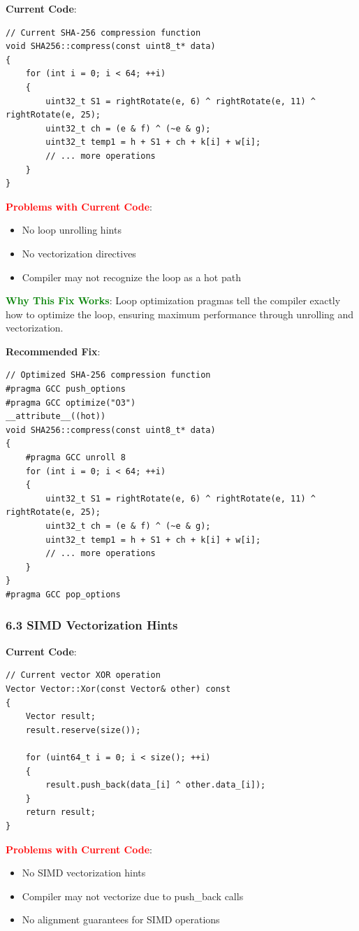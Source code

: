 \documentclass[11pt,a4paper]{article}
\begin{document}
\textbf{Current Code}:
\begin{lstlisting}
// Current SHA-256 compression function
void SHA256::compress(const uint8_t* data)
{
    for (int i = 0; i < 64; ++i)
    {
        uint32_t S1 = rightRotate(e, 6) ^ rightRotate(e, 11) ^ rightRotate(e, 25);
        uint32_t ch = (e & f) ^ (~e & g);
        uint32_t temp1 = h + S1 + ch + k[i] + w[i];
        // ... more operations
    }
}
\end{lstlisting}

\textcolor{red}{\textbf{Problems with Current Code}}:
\begin{itemize}
    \item No loop unrolling hints
    \item No vectorization directives
    \item Compiler may not recognize the loop as a hot path
\end{itemize}

\textcolor{green}{\textbf{Why This Fix Works}}: Loop optimization pragmas tell the compiler exactly how to optimize the loop, ensuring maximum performance through unrolling and vectorization.

\textbf{Recommended Fix}:
\begin{lstlisting}
// Optimized SHA-256 compression function
#pragma GCC push_options
#pragma GCC optimize("O3")
__attribute__((hot))
void SHA256::compress(const uint8_t* data)
{
    #pragma GCC unroll 8
    for (int i = 0; i < 64; ++i)
    {
        uint32_t S1 = rightRotate(e, 6) ^ rightRotate(e, 11) ^ rightRotate(e, 25);
        uint32_t ch = (e & f) ^ (~e & g);
        uint32_t temp1 = h + S1 + ch + k[i] + w[i];
        // ... more operations
    }
}
#pragma GCC pop_options
\end{lstlisting}

\subsubsection{6.3 SIMD Vectorization Hints}

\textbf{Current Code}:
\begin{lstlisting}
// Current vector XOR operation
Vector Vector::Xor(const Vector& other) const
{
    Vector result;
    result.reserve(size());
    
    for (uint64_t i = 0; i < size(); ++i)
    {
        result.push_back(data_[i] ^ other.data_[i]);
    }
    return result;
}
\end{lstlisting}

\textcolor{red}{\textbf{Problems with Current Code}}:
\begin{itemize}
    \item No SIMD vectorization hints
    \item Compiler may not vectorize due to push_back calls
    \item No alignment guarantees for SIMD operations
\end{itemize}
\end{document}
